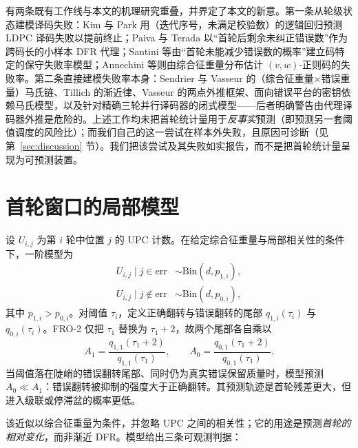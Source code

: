 \documentclass[UTF8,a4paper,10pt,twocolumn]{ctexart}
\begin{document}
有两条既有工作线与本文的机理研究重叠，并界定了本文的新意。第一条从轮级状态建模译码失败：Kim 与 Park 用（迭代序号，未满足校验数）的逻辑回归预测 LDPC 译码失败以提前终止\cite{kim2021logistic}；Paiva 与 Terada 以“首轮后剩余未纠正错误数”作为跨码长的小样本 DFR 代理\cite{paiva2022pickyfix}；Santini 等由“首轮未能减少错误数的概率”建立码特定的保守失败率模型\cite{santini2019conservative}；Annechini 等则由综合征重量分布估计 $(v,w)$-正则码的失败率\cite{annechini2024estimation}。第二条直接建模失败率本身：Sendrier 与 Vasseur 的（综合征重量×错误重量）马氏链\cite{sendrier2019dfr}、Tillich 的渐近律\cite{tillich2018dfp}、Vasseur 的两点外推框架\cite{vasseur2021thesis}、面向错误平台的密钥依赖马氏模型\cite{arpin2025errorfloor}，以及针对精确三轮并行译码器的闭式模型\cite{annechini2025closedform}——后者明确警告由代理译码器外推是危险的。上述工作均未把首轮统计量用于\emph{反事实}预测（即预测另一套阈值调度的风险比）；而我们自己的这一尝试在样本外失败，且原因可诊断（见第~\ref{sec:discussion} 节）。我们把该尝试及其失败如实报告，而不是把首轮统计量呈现为可预测装置。

\section{首轮窗口的局部模型}\label{sec:model}

设 $U_{i,j}$ 为第 $i$ 轮中位置 $j$ 的 UPC 计数。在给定综合征重量与局部相关性的条件下，一阶模型为
\begin{equation}
\begin{aligned}
U_{i,j}\mid j\in\mathrm{err} &\sim \mathrm{Bin}(d,p_{1,i}),\\
U_{i,j}\mid j\notin\mathrm{err} &\sim \mathrm{Bin}(d,p_{0,i}),
\end{aligned}
\end{equation}
其中 $p_{1,i}>p_{0,i}$。对阈值 $\tau_i$，定义正确翻转与错误翻转的尾部
$q_{1,i}(\tau_i)$ 与 $q_{0,i}(\tau_i)$。FRO-2 仅把 $\tau_1$ 替换为 $\tau_1+2$，故两个尾部各自乘以
\begin{equation}
A_1=\frac{q_{1,1}(\tau_1+2)}{q_{1,1}(\tau_1)},\qquad
A_0=\frac{q_{0,1}(\tau_1+2)}{q_{0,1}(\tau_1)} .
\end{equation}
当阈值落在陡峭的错误翻转尾部、同时仍为真实错误保留质量时，模型预测 $A_0\ll A_1$：错误翻转被抑制的强度大于正确翻转。其预测轨迹是首轮残差更大，但进入级联或停滞盆的概率更低。

该近似以综合征重量为条件，并忽略 UPC 之间的相关性；它的用途是预测\emph{首轮的相对变化}，而非渐近 DFR。模型给出三条可观测判据：
\end{document}
